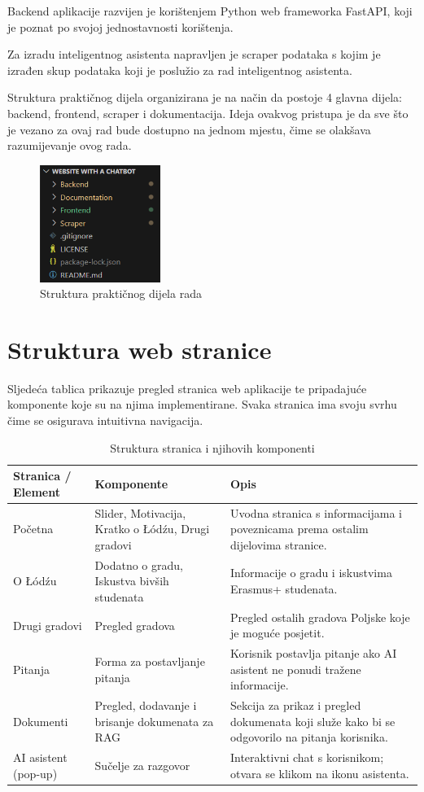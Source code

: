 \documentclass[]{foi}
\renewcommand{\arraystretch}{1.3}
\begin{document}
Backend aplikacije razvijen je korištenjem Python web frameworka FastAPI, koji je poznat po svojoj jednostavnosti korištenja.

Za izradu inteligentnog asistenta napravljen je scraper podataka s kojim je izrađen skup podataka koji je poslužio za rad inteligentnog asistenta.

Struktura praktičnog dijela organizirana je na način da postoje 4 glavna dijela: backend, frontend, scraper i dokumentacija. Ideja ovakvog
pristupa je da sve što je vezano za ovaj rad bude dostupno na jednom mjestu, čime se olakšava razumijevanje ovog rada.
\begin{figure}[ht!]
    \centering
    \includegraphics[width=0.35\textwidth]{./assets/Structure-main.png} 
    \caption{Struktura praktičnog dijela rada}
    \label{fig:slika180}
\end{figure}


\section{Struktura web stranice}
Sljedeća tablica prikazuje pregled stranica web aplikacije te pripadajuće komponente koje su na njima implementirane. Svaka stranica ima svoju
svrhu čime se osigurava intuitivna navigacija. 
\begin{table}[ht!]
\centering
\caption{Struktura stranica i njihovih komponenti}
\renewcommand{\arraystretch}{1.4}
\begin{tabular}{|p{3.5cm}|p{5cm}|p{6.2cm}|}
\hline
\textbf{Stranica / Element} & \textbf{Komponente} & \textbf{Opis} \\
\hline
Početna & Slider, Motivacija, Kratko o Łódźu, Drugi gradovi & Uvodna stranica s informacijama i poveznicama prema ostalim dijelovima stranice. \\
\hline
O Łódźu & Dodatno o gradu, Iskustva bivših studenata & Informacije o gradu i iskustvima Erasmus+ studenata. \\
\hline
Drugi gradovi & Pregled gradova & Pregled ostalih gradova Poljske koje je moguće posjetit. \\
\hline
Pitanja & Forma za postavljanje pitanja & Korisnik postavlja pitanje ako AI asistent ne ponudi tražene informacije. \\
\hline
Dokumenti & Pregled, dodavanje i brisanje dokumenata za RAG & Sekcija za prikaz i pregled dokumenata koji služe kako bi se odgovorilo na pitanja korisnika. \\
\hline
AI asistent (pop-up) & Sučelje za razgovor & Interaktivni chat s korisnikom; otvara se klikom na ikonu asistenta. \\
\hline
\end{tabular}
\end{table}
\end{document}

